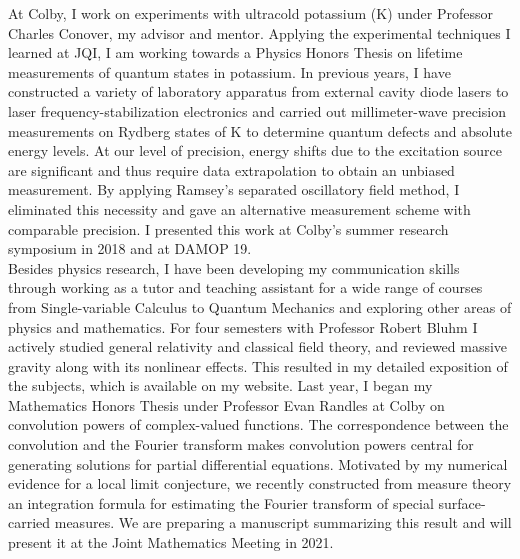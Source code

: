 \documentclass[12pt]{article}
\begin{document}
At Colby, I work on experiments with ultracold potassium (K) under Professor Charles Conover, my advisor and mentor. Applying the experimental techniques I learned at JQI, I am working towards a Physics Honors Thesis on lifetime measurements of quantum states in potassium. In previous years, I have constructed a variety of laboratory apparatus from external cavity diode lasers to laser frequency-stabilization electronics and carried out millimeter-wave precision measurements on Rydberg states of K to determine quantum defects and absolute energy levels. At our level of precision, energy shifts due to the excitation source are significant and thus require data extrapolation to obtain an unbiased measurement. By applying Ramsey's separated oscillatory field method, I eliminated this necessity and gave an alternative measurement scheme with comparable precision. I presented this work at Colby's summer research symposium in 2018 and at DAMOP 19.  \\

Besides physics research, I have been developing my communication skills through working as a tutor and teaching assistant for a wide range of courses from Single-variable Calculus to Quantum Mechanics and exploring other areas of physics and mathematics. For four semesters with Professor Robert Bluhm I actively studied general relativity and classical field theory, and reviewed massive gravity along with its nonlinear effects. This resulted in my detailed exposition of the subjects, which is available on my website. Last year, I began my Mathematics Honors Thesis under Professor Evan Randles at Colby on convolution powers of complex-valued functions. The correspondence between the convolution and the Fourier transform makes convolution powers central for generating solutions for partial differential equations. Motivated by my numerical evidence for a local limit conjecture, we recently constructed from measure theory an integration formula for estimating the Fourier transform of special surface-carried measures. We are preparing a manuscript summarizing this result and will present it at the Joint Mathematics Meeting in 2021. \\ 
\end{document}
